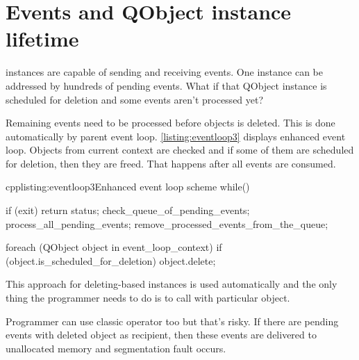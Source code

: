\section{Events and QObject instance lifetime}
 instances are capable of sending and receiving events. One instance can be addressed by hundreds of pending events. What if that QObject instance is scheduled for deletion and some events aren't processed yet?

Remaining events need to be processed before objects is deleted. This is done automatically by parent event loop. \autoref{listing:eventloop3} displays enhanced event loop. Objects from current context are checked and if some of them are scheduled for deletion, then they are freed. That happens after all events are consumed.

\begin{fdoccode}{cpp}{listing:eventloop3}{Enhanced event loop scheme}
while() {
	if (exit) {
		return status;
	}
	check_queue_of_pending_events;
	process_all_pending_events;
	remove_processed_events_from_the_queue;
	
	foreach (QObject object in event_loop_context) {
		if (object.is_scheduled_for_deletion) {
			object.delete;
		}
	}
}
\end{fdoccode}

This approach for deleting-based instances is used automatically and the only thing the programmer needs to do is to call with particular object.

Programmer can use classic operator too but that's risky. If there are pending events with deleted object as recipient, then these events are delivered to unallocated memory and segmentation fault occurs.



